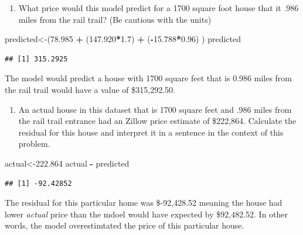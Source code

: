\documentclass[]{article}
\newenvironment{Shaded}{\begin{snugshade}}{\end{snugshade}}
\newcommand{\FloatTok}[1]{\textcolor[rgb]{0.00,0.00,0.81}{#1}}
\newcommand{\NormalTok}[1]{#1}
\newcommand{\OperatorTok}[1]{\textcolor[rgb]{0.81,0.36,0.00}{\textbf{#1}}}
\newcommand{\StringTok}[1]{\textcolor[rgb]{0.31,0.60,0.02}{#1}}
\providecommand{\tightlist}{%
  \setlength{\itemsep}{0pt}\setlength{\parskip}{0pt}}
\begin{document}
\begin{enumerate}
\def\labelenumi{\arabic{enumi}.}
\setcounter{enumi}{3}
\tightlist
\item
  What price would this model predict for a 1700 square foot house that
  it .986 miles from the rail trail? (Be cautious with the units)
\end{enumerate}

\begin{Shaded}
\begin{Highlighting}[]
\NormalTok{predicted<-(}\FloatTok{78.985} \OperatorTok{+}\StringTok{ }\NormalTok{(}\FloatTok{147.920}\OperatorTok{*}\FloatTok{1.7}\NormalTok{) }\OperatorTok{+}\StringTok{ }\NormalTok{(}\OperatorTok{-}\FloatTok{15.788}\OperatorTok{*}\FloatTok{0.96}\NormalTok{) )}
\NormalTok{predicted}
\end{Highlighting}
\end{Shaded}

\begin{verbatim}
## [1] 315.2925
\end{verbatim}

The model would predict a house with 1700 square feet that is 0.986
miles from the rail trail would have a value of \$315,292.50.

\begin{enumerate}
\def\labelenumi{\arabic{enumi}.}
\setcounter{enumi}{3}
\tightlist
\item
  An actual house in this dataset that is 1700 square feet and .986
  miles from the rail trail entrance had an Zillow price estimate of
  \$222,864. Calculate the residual for this house and interpret it in a
  sentence in the context of this problem.
\end{enumerate}

\begin{Shaded}
\begin{Highlighting}[]
\NormalTok{actual<-}\FloatTok{222.864}
\NormalTok{actual }\OperatorTok{-}\StringTok{ }\NormalTok{predicted}
\end{Highlighting}
\end{Shaded}

\begin{verbatim}
## [1] -92.42852
\end{verbatim}

The residual for this particular home was \$-92,428.52 meaning the house
had lower \emph{actual} price than the mdoel would have expected by
\$92,482.52. In other words, the model overestimtated the price of this
particular house.
\end{document}
